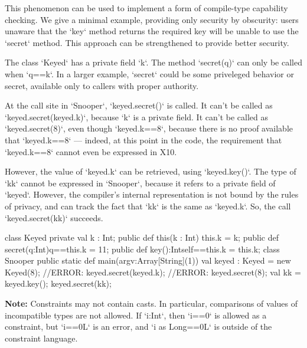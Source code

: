 \begin{ex}
This phenomenon can be used to implement a form of compile-type capability
checking. We give a minimal example, providing only security by obscurity: 
users unaware that the \xcd`key` method returns the required key will be
unable to use the \xcd`secret` method.  This approach can be strengthened to
provide better security.

The class \xcd`Keyed` has a private field \xcd`k`.  The method \xcd`secret(q)`
can only be called when \xcd`q==k`. In a larger example, \xcd`secret` could be
some priveleged behavior or secret, available only to callers with proper
authority.

At the call site in \xcd`Snooper`, \xcd`keyed.secret()` is called.
It can't be called as \xcd`keyed.secret(keyed.k)`, because \xcd`k` is a private
field.
It can't be called as \xcd`keyed.secret(8)`, even though \xcd`keyed.k==8`,
because there
is no proof available that \xcd`keyed.k==8` --- indeed, at this point in the
code, the requirement that \xcd`keyed.k==8` cannot even be expressed in X10.

However,  the value of \xcd`keyed.k` can be retrieved, using
\xcd`keyed.key()`.   
The type of \xcd`kk` cannot be expressed in \xcd`Snooper`, because it refers to
a private field of \xcd`keyed`.  However, the compiler's internal
representation is not bound by the rules of privacy, and can track the fact
that \xcd`kk` is the same as \xcd`keyed.k`.  So, the call \xcd`keyed.secret(kk)`
succeeds.
\begin{xten}
class Keyed {
  private val k : Int;
  public def this(k : Int) {
    this.k = k; 
  }
  public def secret(q:Int){q==this.k} = 11;
  public def key():Int{self==this.k} = this.k;
}
class Snooper {
  public static def main(argv:Array[String](1)) {
    val keyed : Keyed = new Keyed(8);
    //ERROR: keyed.secret(keyed.k);
    //ERROR: keyed.secret(8);
    val kk = keyed.key();
    keyed.secret(kk);
  }
}

\end{xten}
%


\end{ex}


{\bf Note:} Constraints may not contain casts.   In particular, comparisons of
values of incompatible types are not allowed.  If \xcd`i:Int`, then \xcd`i==0`
is allowed as a constraint, but \xcd`i==0L` is an error, and 
\xcd`i as Long==0L` is outside of the constraint language.


